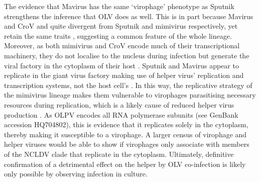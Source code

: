 The evidence that Mavirus has the same `virophage' phenotype as Sputnik strengthens the inference that \ac{OLV} does as well.
This is in part because Mavirus and \ac{CroV} and quite divergent from Sputnik and mimivirus respectively, yet retain the same traits \cite{Fischer2010, Fischer2011a}, suggesting a common feature of the whole lineage.
Moreover, as both mimivirus and \ac{CroV} encode much of their transcriptional machinery, they do not localise to the nucleus during infection but generate the viral factory in the cytoplasm of their host \cite{LaScola2008, Fischer2010}.
Sputnik and Mavirus appear to replicate in the giant virus factory making use of helper virus' replication and transcription systems, not the host cell's \cite{LaScola2008, Claverie2009, Fischer2011a}.
In this way, the replicative strategy of the mimivirus lineage makes them vulnerable to virophages parasitising necessary resources during replication, which is a likely cause of reduced helper virus production \cite{Claverie2009, Fischer2011a, Fischer2011b}.
As \ac{OLPV} encodes all \textsc{RNA} polymerase subunits (see GenBank accession HQ704802), this is evidence that it replicates solely in the cytoplasm, thereby making it susceptible to a virophage.
A larger census of virophage and helper viruses would be able to show if virophages only associate with members of the \ac{NCLDV} clade that replicate in the cytoplasm.
Ultimately, definitive confirmation of a detrimental effect on the helper by \ac{OLV} co-infection is likely only possible by observing infection in culture.

